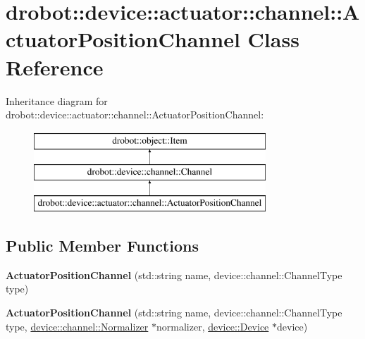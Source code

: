 \hypertarget{classdrobot_1_1device_1_1actuator_1_1channel_1_1ActuatorPositionChannel}{\section{drobot\-:\-:device\-:\-:actuator\-:\-:channel\-:\-:Actuator\-Position\-Channel Class Reference}
\label{classdrobot_1_1device_1_1actuator_1_1channel_1_1ActuatorPositionChannel}
}
Inheritance diagram for drobot\-:\-:device\-:\-:actuator\-:\-:channel\-:\-:Actuator\-Position\-Channel\-:\begin{figure}[H]
\begin{center}
\leavevmode
\includegraphics[height=3.000000cm]{classdrobot_1_1device_1_1actuator_1_1channel_1_1ActuatorPositionChannel}
\end{center}
\end{figure}
\subsection*{Public Member Functions}
\begin{DoxyCompactItemize}
\item 
\hypertarget{classdrobot_1_1device_1_1actuator_1_1channel_1_1ActuatorPositionChannel_a4ccdc5fa689006173ca5bb0aaf9c52a8}{{\bfseries Actuator\-Position\-Channel} (std\-::string name, device\-::channel\-::\-Channel\-Type type)}\label{classdrobot_1_1device_1_1actuator_1_1channel_1_1ActuatorPositionChannel_a4ccdc5fa689006173ca5bb0aaf9c52a8}

\item 
\hypertarget{classdrobot_1_1device_1_1actuator_1_1channel_1_1ActuatorPositionChannel_a89d497876bbb34d206cb88afeb462a20}{{\bfseries Actuator\-Position\-Channel} (std\-::string name, device\-::channel\-::\-Channel\-Type type, \hyperlink{classdrobot_1_1device_1_1channel_1_1Normalizer}{device\-::channel\-::\-Normalizer} $\ast$normalizer, \hyperlink{classdrobot_1_1device_1_1Device}{device\-::\-Device} $\ast$device)}\label{classdrobot_1_1device_1_1actuator_1_1channel_1_1ActuatorPositionChannel_a89d497876bbb34d206cb88afeb462a20}

\end{DoxyCompactItemize}
